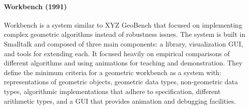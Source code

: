 \paragraph{Workbench (1991)}

Workbench is a system similar to XYZ GeoBench that focused on implementing
complex geometric algorithms instead of robustness issues. The system is built
in Smalltalk and composed of three main components: a library, visualization
GUI, and tools for extending each. It focused heavily on empirical comparisons of different
algorithms and using animations for teaching and demonstration. They define the
minimum criteria for a geometric workbench as a system with: representations of
geometric objects, geometric data types, non-geometric data types, algorithmic
implementations that adhere to specification, different arithmetic types, and a
GUI that provides animation and debugging facilities.

% 

